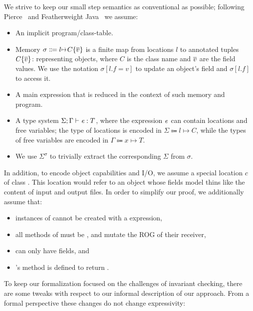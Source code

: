 We strive to keep our small step semantics as conventional as possible; following Pierce~\cite{pierce2002types} and Featherweight Java~\cite{IgarashiEtAl01} we assume:
\begin{itemize}
\item An implicit program/class-table.
\item Memory $\sigma\Coloneqq l\mapsto C\{\Many{v}\}$ is a finite map from locations $l$ to annotated tuples $C\{\hspace{0.03ex} \overline{\hspace{-0.03ex}v\hspace{-0.03ex}} \hspace{0.03ex}\}$: representing objects,
where $C$ is the class name and $\hspace{0.03ex} \overline{\hspace{-0.03ex}v\hspace{-0.03ex}} \hspace{0.03ex}$ are the field values.
We use the notation $\sigma[l.f=v]$ to update an object's field and $\sigma[l.f]$ to access it.
\item A main expression that is reduced in the context of such memory and program.
\item A type system $\Sigma;\Gamma\vdash{\ensuremath{\mathit{e}}}:T$, where 
the expression ${\mathit{e}}$ can contain locations and free variables;
the type of locations is encoded in $\Sigma\Coloneqq l\mapsto C$,
while the types of free variables are encoded in $\Gamma\Coloneqq x\mapsto T$.
\item We use $\Sigma^\sigma$ to trivially extract the corresponding $\Sigma$ from $\sigma$.
\end{itemize}
In addition, to encode object capabilities and I/O, we assume a special location  $c$ of class \Q@Cap@. This location would refer to an object whose fields model thins like the content of input and output files. In order to simplify our proof, we additionally assume that:
\begin{itemize}
	\item instances of \Q@Cap@ cannot be created with a \Q@new@ expression,
	\item all methods of \Q@Cap@ must be \Q@mut@, and mutate the ROG of their receiver,
	\item \Q@Cap@ can only have \Q@mut@ fields, and
	\item \Q@Cap@'s \Q@invariant@ method is defined to return \Q@true@.
\end{itemize}
\noindent To keep our formalization focused on
the challenges of invariant checking, 
there are some
tweaks with respect to our informal description of our approach.
From a formal perspective 
these changes do not change expressivity:
